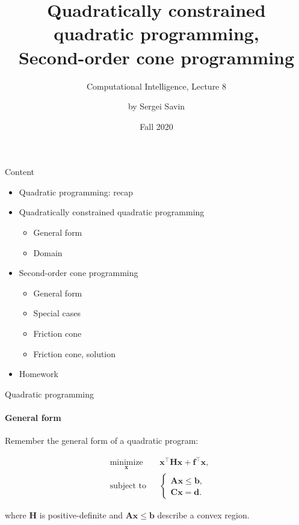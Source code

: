 \documentclass{beamer}
\title{Quadratically constrained quadratic programming, \\ Second-order cone programming }
\subtitle{Computational Intelligence, Lecture 8}
\author{by Sergei Savin}
\date{Fall 2020}
\begin{document}
\maketitle


\begin{frame}{Content}

\begin{itemize}
\item  Quadratic programming: recap
\item  Quadratically constrained quadratic programming
\begin{itemize}
    \item General form
    \item Domain
\end{itemize}
\item  Second-order cone programming
\begin{itemize}
    \item General form
    \item Special cases
    \item Friction cone
    \item Friction cone, solution
\end{itemize}
\item Homework
\end{itemize}

\end{frame}



\begin{frame}{Quadratic programming}
\framesubtitle{General form}
\begin{flushleft}

Remember the general form of a quadratic program:

%
\begin{equation}
\begin{aligned}
& \underset{\mathbf{x}}{\text{minimize}}
& & \mathbf{x}^\top \mathbf{H} \mathbf{x} + \mathbf{f}^\top\mathbf{x}, \\
& \text{subject to}
& & \begin{cases}
    \mathbf{A}\mathbf{x} \leq \mathbf{b}, \\
    \mathbf{C}\mathbf{x} = \mathbf{d}.
    \end{cases}
\end{aligned}
\end{equation}

where $\mathbf{H}$ is positive-definite and $\mathbf{A}\mathbf{x} \leq \mathbf{b}$ describe a convex region.
 
\end{flushleft}
\end{frame}
\end{document}
